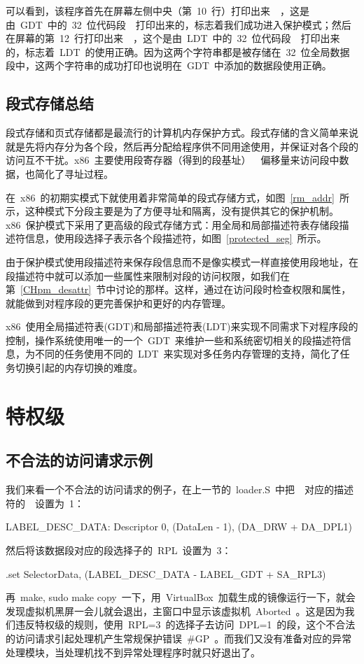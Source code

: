 可以看到，该程序首先在屏幕左侧中央（第~10~行）打印出来~~，这是由~GDT~中的~32~位代码段~~打印出来的，标志着我们成功进入保护模式；然后在屏幕的第~12~行打印出来~~，这个是由~LDT~中的~32~位代码段~~打印出来的，标志着~LDT~的使用正确。因为这两个字符串都是被存储在~32~位全局数据段中，这两个字符串的成功打印也说明在~GDT~中添加的数据段使用正确。

\subsection{段式存储总结}

段式存储和页式存储都是最流行的计算机内存保护方式。段式存储的含义简单来说就是先将内存分为各个段，然后再分配给程序供不同用途使用，并保证对各个段的访问互不干扰。x86~主要使用段寄存器（得到的段基址）~\code{+}~偏移量来访问段中数据，也简化了寻址过程。

在~x86~的初期实模式下就使用着非常简单的段式存储方式，如图~\ref{rm_addr}~所示，这种模式下分段主要是为了方便寻址和隔离，没有提供其它的保护机制。x86~保护模式下采用了更高级的段式存储方式：用全局和局部描述符表存储段描述符信息，使用段选择子表示各个段描述符，如图~\ref{protected_seg}~所示。

由于保护模式使用段描述符来保存段信息而不是像实模式一样直接使用段地址，在段描述符中就可以添加一些属性来限制对段的访问权限，如我们在第~\ref{CHpm_desattr}~节中讨论的那样。这样，通过在访问段时检查权限和属性，就能做到对程序段的更完善保护和更好的内存管理。

x86~使用全局描述符表(GDT)和局部描述符表(LDT)来实现不同需求下对程序段的控制，操作系统使用唯一的一个~GDT~来维护一些和系统密切相关的段描述符信息，为不同的任务使用不同的~LDT~来实现对多任务内存管理的支持，简化了任务切换引起的内存切换的难度。

\section{特权级}

\subsection{不合法的访问请求示例}

我们来看一个不合法的访问请求的例子，在上一节的~loader.S~中把~~对应的描述符的~~设置为~1：
\begin{Command}
LABEL_DESC_DATA:    Descriptor        0,      (DataLen - 1), (DA_DRW + DA_DPL1)
\end{Command}

然后将该数据段对应的段选择子的~RPL~设置为~3：
\begin{Command}
.set    SelectorData,   (LABEL_DESC_DATA   - LABEL_GDT + SA_RPL3)
\end{Command}

再~make, sudo make copy~一下，用~VirtualBox~加载生成的镜像运行一下，就会发现虚拟机黑屏一会儿就会退出，主窗口中显示该虚拟机~Aborted~。这是因为我们违反特权级的规则，使用~RPL=3~的选择子去访问~DPL=1~的段，这个不合法的访问请求引起处理机产生常规保护错误~\#GP~。而我们又没有准备对应的异常处理模块，当处理机找不到异常处理程序时就只好退出了。